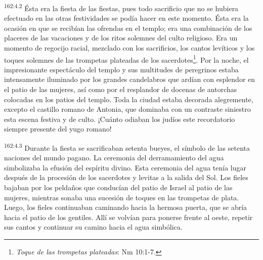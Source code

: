 \par 
\textsuperscript{162:4.2} Ésta era la fiesta de las fiestas, pues todo sacrificio que no se hubiera efectuado en las otras festividades se podía hacer en este momento. Ésta era la ocasión en que se recibían las ofrendas en el templo; era una combinación de los placeres de las vacaciones y de los ritos solemnes del culto religioso. Era un momento de regocijo racial, mezclado con los sacrificios, los cantos levíticos y los toques solemnes de las trompetas plateadas de los sacerdotes\footnote{\textit{Toque de las trompetas plateadas}: Nm 10:1-7.}. Por la noche, el impresionante espectáculo del templo y sus multitudes de peregrinos estaba intensamente iluminado por los grandes candelabros que ardían con esplendor en el patio de las mujeres, así como por el resplandor de docenas de antorchas colocadas en los patios del templo. Toda la ciudad estaba decorada alegremente, excepto el castillo romano de Antonia, que dominaba con un contraste siniestro esta escena festiva y de culto. ¡Cuánto odiaban los judíos este recordatorio siempre presente del yugo romano!

\par 
\textsuperscript{162:4.3} Durante la fiesta se sacrificaban setenta bueyes, el símbolo de las setenta naciones del mundo pagano. La ceremonia del derramamiento del agua simbolizaba la efusión del espíritu divino. Esta ceremonia del agua tenía lugar después de la procesión de los sacerdotes y levitas a la salida del Sol. Los fieles bajaban por los peldaños que conducían del patio de Israel al patio de las mujeres, mientras sonaba una sucesión de toques en las trompetas de plata. Luego, los fieles continuaban caminando hacia la hermosa puerta, que se abría hacia el patio de los gentiles. Allí se volvían para ponerse frente al oeste, repetir sus cantos y continuar su camino hacia el agua simbólica.

